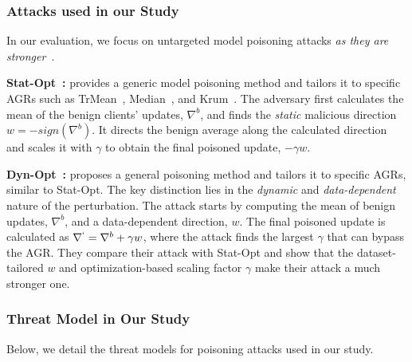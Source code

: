 \subsubsection{Attacks used in our Study}\label{background:attacks_study}
In our evaluation, we focus on untargeted model poisoning attacks \emph{as they are stronger}~\cite{shejwalkar2022back}.

\noindent\textbf{Stat-Opt~\cite{fang2020local}:} provides a generic model poisoning method and tailors it to specific AGRs such as TrMean~\cite{yin2018byzantine}, Median~\cite{yin2018byzantine}, and Krum~\cite{blanchard2017machine}. The adversary first calculates the mean of the benign clients' updates, $\nabla^b$, and finds the \emph{static} malicious direction $w = -sign(\nabla^b)$. 
It directs the benign average along the calculated direction and scales it with $\gamma$ to obtain the final poisoned update, $-\gamma w$.

\noindent\textbf{Dyn-Opt~\cite{shejwalkar2021manipulating}:} proposes a general poisoning method and tailors it to specific AGRs, similar to Stat-Opt. The key distinction lies in the \emph{dynamic} and \emph{data-dependent} nature of the perturbation. The attack starts by computing the mean of benign updates, 
$\nabla^b$, and a data-dependent direction, $w$. The final poisoned update is calculated as $\nabla^` = \nabla^b + \gamma w$, where the attack finds the largest $\gamma$ that can bypass the AGR. They compare their attack with Stat-Opt and show that the dataset-tailored $w$ and optimization-based scaling factor $\gamma$ make their attack a much stronger one.
\subsubsection{Threat Model in Our Study}\label{background:threat_model}
Below, we detail the threat models for poisoning attacks used in our study.

